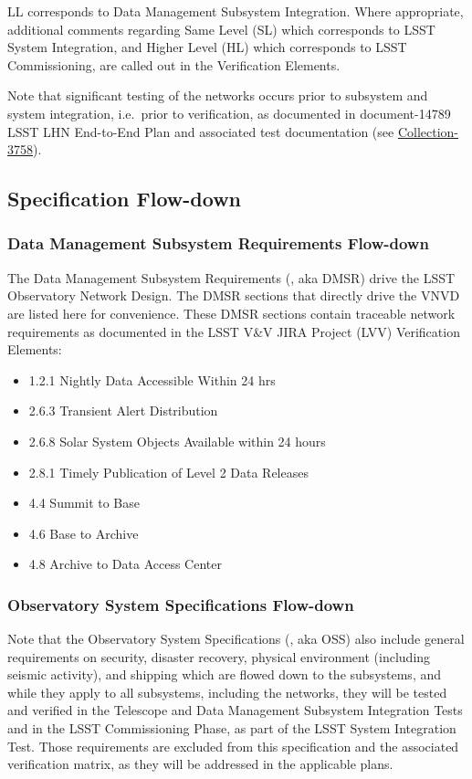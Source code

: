 \documentclass[DM,lsstdraft,STS,toc]{lsstdoc}
\begin{document}
LL corresponds to Data Management Subsystem Integration.
Where appropriate, additional comments regarding Same Level (SL) which corresponds to LSST System Integration, and Higher Level (HL) which corresponds to LSST Commissioning, are called out in the Verification Elements.

Note that significant testing of the networks occurs prior to subsystem and system integration, i.e.\  prior to verification, as documented in document-14789 LSST LHN End-to-End Plan and associated test documentation (see \href{https://docushare.lsstcorp.org/docushare/dsweb/View/Collection-3758}{Collection-3758}).

\subsection{Specification Flow-down}\label{sec:sepcflowd}

\subsubsection{Data Management Subsystem Requirements Flow-down}\label{sec:dmreqflowd}

The Data Management Subsystem Requirements (, aka DMSR) drive the LSST Observatory Network Design.
The DMSR sections that directly drive the VNVD are listed here for convenience.
These DMSR sections contain traceable network requirements as documented in the LSST V\&V JIRA Project (LVV) Verification Elements:

\begin{itemize}
\item 1.2.1 Nightly Data Accessible Within 24 hrs
\item 2.6.3 Transient Alert Distribution
\item 2.6.8 Solar System Objects Available within 24 hours
\item 2.8.1 Timely Publication of Level 2 Data Releases
\item 4.4 Summit to Base
\item 4.6 Base to Archive
\item 4.8 Archive to Data Access Center
\end{itemize}

\subsubsection{Observatory System Specifications Flow-down}\label{sec:ossflowd}

Note that the Observatory System Specifications (, aka OSS) also include general requirements on security, disaster recovery, physical environment (including seismic activity), and shipping which are flowed down to the subsystems, and while they apply to all subsystems, including the networks, they will be tested and verified in the Telescope and Data Management Subsystem Integration Tests and in the LSST Commissioning Phase, as part of the LSST System Integration Test.
Those requirements are excluded from this specification and the associated verification matrix, as they will be addressed in the applicable plans.
\end{document}

